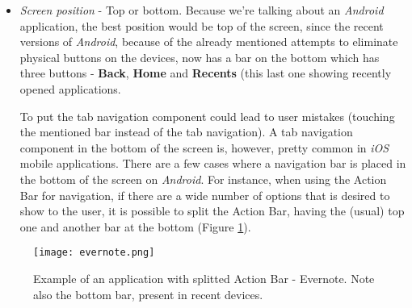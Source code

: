 \begin{itemize}
\item \emph{Screen position} - Top or bottom. Because we're talking about an \emph{Android} application, the best position would be top of the screen, since the recent versions of \emph{Android}, because of the already mentioned attempts to eliminate physical buttons on the devices, now has a bar on the bottom which has three buttons - \textbf{Back}, \textbf{Home} and \textbf{Recents} (this last one showing recently opened applications.

To put the tab navigation component could lead to user mistakes (touching the mentioned bar instead of the tab navigation). A tab navigation component in the bottom of the screen is, however, pretty common in \emph{iOS} mobile applications. 
There are a few cases where a navigation bar is placed in the bottom of the screen on \emph{Android}. For instance, when using the Action Bar for navigation, if there are a wide number of options that is desired to show to the user, it is possible to split the Action Bar, having the (usual) top one and another bar at the bottom (Figure \ref{fig:evernote}). 


\end{itemize}

\begin{figure}[h!]
  \begin{center}
    \leavevmode
    \texttt{[image: evernote.png]}
    \caption{Example of an application with splitted Action Bar - Evernote. Note also the bottom bar, present in recent devices.}
    \label{fig:evernote}
  \end{center}
\end{figure}

